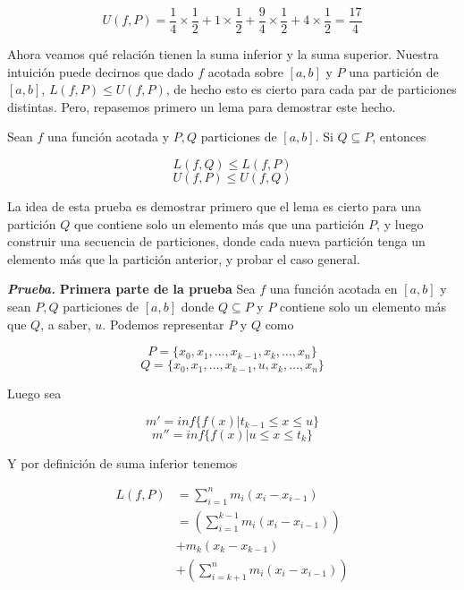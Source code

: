 \documentclass{report}
\begin{document}
    \[
    U(f, P) = \frac{1}{4} \times \frac{1}{2} + 1 \times \frac{1}{2} + \frac{9}{4} \times \frac{1}{2} + 4 \times \frac{1}{2} = \frac{17}{4}
    \]

    Ahora veamos qué relación tienen la suma inferior y la suma superior. Nuestra intuición puede decirnos que dado $f$ acotada sobre $[a,b]$ y $P$ una partición de $[a,b]$, $L(f, P) \leq U(f, P)$, de hecho esto es cierto para cada par de particiones distintas. Pero, repasemos primero un lema para demostrar este hecho.

    \begin{lemBox}
        Sean $f$ una función acotada y $P, Q$ particiones de $[a,b]$. Si $Q \subseteq P$, entonces

        $$L(f, Q) \leq L(f, P) $$
        $$U(f, P) \leq U(f, Q) $$
    \end{lemBox}

    \begin{ideaBox}
        La idea de esta prueba es demostrar primero que el lema es cierto para una partición $Q$ que contiene solo un elemento más que una partición $P$, y luego construir una secuencia de particiones, donde cada nueva partición tenga un elemento más que la partición anterior, y probar el caso general.
    \end{ideaBox}

    \textit{\textbf{Prueba.}}
    \noindent\textbf{Primera parte de la prueba}
    Sea $f$ una función acotada en $[a,b]$ y sean $P, Q$ particiones de $[a,b]$ donde $Q \subseteq P$ y $P$ contiene solo un elemento más que $Q$, a saber, $u$. Podemos representar $P$ y $Q$ como

    $$P = \{x_0,x_1,\dots,x_{k-1},x_k,\dots,x_n\}$$
    $$Q = \{x_0,x_1,\dots,x_{k-1},u,x_k,\dots,x_n\}$$

    Luego sea

    $$m' = inf\{f(x) | t_{k-1} \leq x \leq u\}$$
    $$m'' = inf\{f(x) | u \leq x \leq t_k\}$$

    Y por definición de suma inferior tenemos

    \begin{align*}
        L(f,P) &= \sum_{i=1}^{n} m_i(x_i-x_{i-1})\\
        &= \left(\sum_{i=1}^{k-1}m_i(x_i-x_{i-1})\right) \\
        &+ m_k(x_k-x_{k-1}) \\
        &+ \left(\sum_{i=k+1}^{n}m_i(x_i-x_{i-1})\right)
    \end{align*}
\end{document}
